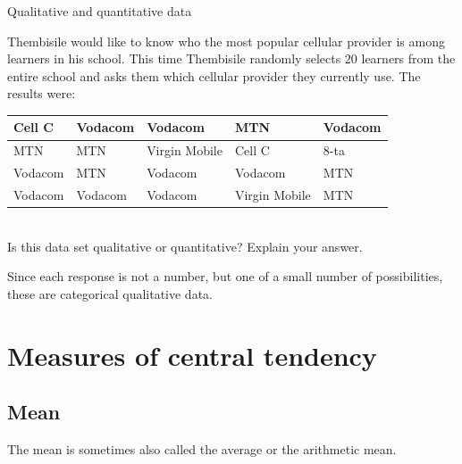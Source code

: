\begin{wex}{Qualitative and quantitative data}{
    Thembisile would like to know who the most popular cellular
    provider is among learners in his school. This time Thembisile
    randomly selects $20$ learners from the entire school and asks them
    which cellular provider they currently use. The results were:

    \begin{center}
      \begin{tabular}{|p{}|p{}|p{}|p{}|p{}|}\hline
        
        Cell C & Vodacom & Vodacom & MTN & Vodacom \\\hline
        MTN & MTN & Virgin Mobile & Cell C & 8-ta \\\hline
        Vodacom & MTN & Vodacom & Vodacom & MTN \\\hline
        Vodacom & Vodacom & Vodacom & Virgin Mobile & MTN \\\hline
      \end{tabular}
    \end{center}
\vspace{8pt}\\
    Is this data set qualitative or quantitative? Explain your answer.
}{
  Since each response is not a number, but one of a small number of
  possibilities, these are categorical qualitative data.

}
\end{wex}

\section{Measures of central tendency}

\subsection{Mean}
The mean is sometimes also called the average or the arithmetic mean.

